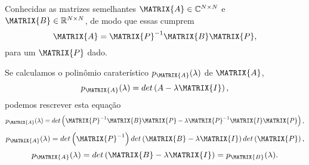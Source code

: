 \begin{myproofT}\label{proof:theo:similhante1}
Conhecidas as matrizes semelhantes $\MATRIX{A} \in \mathbb{C}^{N \times N}$ e $\MATRIX{B} \in \mathbb{R}^{N \times N}$,
de modo que essas cumprem 
\begin{equation}
\MATRIX{A} = \MATRIX{P}^{-1} \MATRIX{B} \MATRIX{P},
\end{equation}
para um $\MATRIX{P}$ dado.

Se calculamos o polinômio caraterístico $p_{\MATRIX{A}}(\lambda)$ de $\MATRIX{A}$,
\begin{equation}
p_{\MATRIX{A}}(\lambda)=det\left(A-\lambda \MATRIX{I}\right),
\end{equation}
podemos rescrever esta equação
\begin{equation}
p_{\MATRIX{A}}(\lambda)=det\left(\MATRIX{P}^{-1} \MATRIX{B} \MATRIX{P}-\lambda \MATRIX{P}^{-1} \MATRIX{I} \MATRIX{P} \right),
\end{equation}
\begin{equation}
p_{\MATRIX{A}}(\lambda)=det\left( \MATRIX{P}^{-1}\right)det\left( \MATRIX{B} -\lambda \MATRIX{I} \right)det\left( \MATRIX{P}\right),
\end{equation}
\begin{equation}
p_{\MATRIX{A}}(\lambda)=det\left( \MATRIX{B} -\lambda \MATRIX{I} \right) = p_{\MATRIX{B}}(\lambda).
\end{equation}
\end{myproofT}


